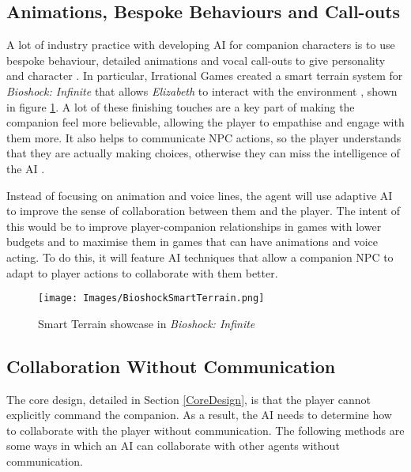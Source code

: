 \documentclass{IEEEtran}
\begin{document}
\subsection{Animations, Bespoke Behaviours and Call-outs}
\label{ABC}

A lot of industry practice with developing AI for companion characters is to use bespoke behaviour, detailed animations and vocal call-outs to give personality and character \cite{GAIP2EllieAI, GMTGoodAI, GAIPOReactions}. In particular, Irrational Games created a smart terrain system for \textit{Bioshock: Infinite} that allows \textit{Elizabeth} to interact with the environment \cite{GDCElizabeth, AIGamesBioshockAI}, shown in figure \ref{fig:BioshockSmartTerrain}. A lot of these finishing touches are a key part of making the companion feel more believable, allowing the player to empathise and engage with them more. It also helps to communicate NPC actions, so the player understands that they are actually making choices, otherwise they can miss the intelligence of the AI \cite{GMTGoodAI}.

Instead of focusing on animation and voice lines, the agent will use adaptive AI to improve the sense of collaboration between them and the player. The intent of this would be to improve player-companion relationships in games with lower budgets and to maximise them in games that can have animations and voice acting. To do this, it will feature AI techniques that allow a companion NPC to adapt to player actions to collaborate with them better.

\begin{figure}
  \centering
  \texttt{[image: Images/BioshockSmartTerrain.png]}
  
\caption{Smart Terrain showcase in \textit{Bioshock: Infinite}}
\label{fig:BioshockSmartTerrain}
\end{figure}

\subsection{Collaboration Without Communication}
\label{Communication}

The core design, detailed in Section \ref{CoreDesign}, is that the player cannot explicitly command the companion. As a result, the AI needs to determine how to collaborate with the player without communication. The following methods are some ways in which an AI can collaborate with other agents without communication.
\end{document}
